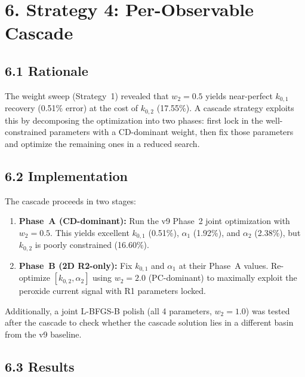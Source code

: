 \documentclass[11pt]{article}
\begin{document}
\section*{6. Strategy 4: Per-Observable Cascade}\label{sec:strat4}

\subsection*{6.1 Rationale}

The weight sweep (Strategy~1) revealed that $w_2 = 0.5$ yields near-perfect
$k_{0,1}$ recovery (0.51\% error) at the cost of $k_{0,2}$ (17.55\%).  A
cascade strategy exploits this by decomposing the optimization into two phases:
first lock in the well-constrained parameters with a CD-dominant weight, then
fix those parameters and optimize the remaining ones in a reduced search.

\subsection*{6.2 Implementation}

The cascade proceeds in two stages:
\begin{enumerate}
  \item \textbf{Phase~A (CD-dominant):} Run the v9 Phase~2 joint optimization
        with $w_2 = 0.5$.  This yields excellent $k_{0,1}$ (0.51\%),
        $\alpha_1$ (1.92\%), and $\alpha_2$ (2.38\%), but $k_{0,2}$ is poorly
        constrained (16.60\%).

  \item \textbf{Phase~B (2D R2-only):} Fix $k_{0,1}$ and $\alpha_1$ at their
        Phase~A values.  Re-optimize $[k_{0,2}, \alpha_2]$ using $w_2 = 2.0$
        (PC-dominant) to maximally exploit the peroxide current signal with
        R1 parameters locked.
\end{enumerate}

Additionally, a joint L-BFGS-B polish (all 4 parameters, $w_2 = 1.0$) was
tested after the cascade to check whether the cascade solution lies in a
different basin from the v9 baseline.

\subsection*{6.3 Results}
\end{document}
